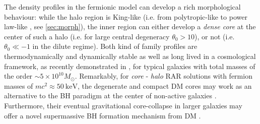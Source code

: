 The density profiles in the fermionic model can develop a rich morphological behaviour: while the halo region is King-like (i.e. from polytropic-like  to power law-like , see \ref{sec:morph}), the inner region can either develop a \textit{dense core} at the center of such a halo (i.e. for large central degeneracy $\theta_0 > 10$), or not (i.e. $\theta_0 \ll -1$ in the dilute regime). Both kind of family profiles are thermodynamically and dynamically stable as well as long lived in a cosmological framework, as recently demonstrated in \citet{2021MNRAS.502.4227A}, for typical galaxies with total masses of the order $\sim 5\times 10^{10} M_\odot$. Remarkably, for \textit{core} - \textit{halo} RAR solutions with fermion masses of $m c^2\approx \SI{50}{\kilo\eV}$, the degenerate and compact DM cores may work as an alternative to the BH paradigm at the center of non-active galaxies \citep{2018PDU....21...82A,2019PDU....24..278A,2020A&A...641A..34B,2021MNRAS.505L..64B,2022MNRAS.511L..35A}. Furthermore, their eventual gravitational core-collapse in larger galaxies may offer a novel supermassive BH formation mechanism from DM \citep{2021MNRAS.502.4227A}.


